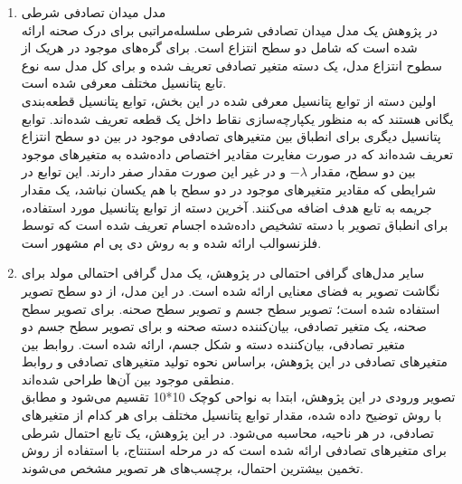 \begin{enumerate}
\begin{enumerate}
		\item مدل میدان تصادفی شرطی\\
		در پژوهش\cite{fidler2013sentence} 
		یک مدل میدان تصادفی شرطی سلسله‌مراتبی برای درک صحنه ارائه شده است که شامل دو سطح انتزاع است. برای گره‌های موجود در هریک از سطوح انتزاع مدل، یک دسته متغیر تصادفی تعریف شده و برای کل مدل سه نوع تابع پتانسیل مختلف معرفی شده است.
		\\
		اولین دسته از توابع پتانسیل معرفی شده در این بخش، توابع پتانسیل قطعه‌بندی یگانی هستند که به منظور یکپارچه‌سازی نقاط داخل یک قطعه تعریف شده‌اند. توابع پتانسیل دیگری برای انطباق بین متغیرهای تصادفی موجود در بین دو سطح انتزاع تعریف شده‌اند که در صورت مغایرت مقادیر اختصاص داده‌شده به متغیرهای موجود بین دو سطح، مقدار $-\lambda$ و در غیر این صورت مقدار صفر دارند. این توابع در شرایطی که مقادیر متغیرهای موجود در دو سطح با هم یکسان نباشد، یک مقدار جریمه به تابع هدف اضافه می‌کنند. آخرین دسته از توابع پتانسیل مورد استفاده، برای انطباق تصویر با دسته تشخیص داده‌شده اجسام تعریف شده است که توسط فلزنسوالب ارائه شده و به روش دی پی ام مشهور است.
		
		\item سایر مدل‌های گرافی احتمالی
در پژوهش\cite{li2007and}، یک مدل گرافی احتمالی مولد برای نگاشت تصویر به فضای معنایی ارائه شده است. در این مدل، از دو سطح تصویر استفاده شده است؛ تصویر سطح جسم و تصویر سطح صحنه. برای تصویر سطح صحنه، یک متغیر تصادفی، بیان‌کننده دسته صحنه و برای تصویر سطح جسم دو متغیر تصادفی، بیان‌کننده دسته و شکل جسم، ارائه شده است. روابط بین متغیرهای تصادفی در این پژوهش، براساس نحوه تولید متغیرهای تصادفی و روابط منطقی موجود بین آن‌ها طراحی شده‌اند.
\\
تصویر ورودی در این پژوهش، ابتدا به نواحی کوچک 10*10 تقسیم می‌شود و مطابق با روش توضیح داده شده، مقدار توابع پتانسیل مختلف برای هر کدام از متغیرهای تصادفی، در هر ناحیه، محاسبه می‌شود. در این پژوهش، یک تابع احتمال شرطی برای متغیرهای تصادفی ارائه شده است که در مرحله استنتاج، با استفاده از روش تخمین بیشترین احتمال، برچسب‌های هر تصویر مشخص می‌شوند.
	\end{enumerate}


\end{enumerate}
